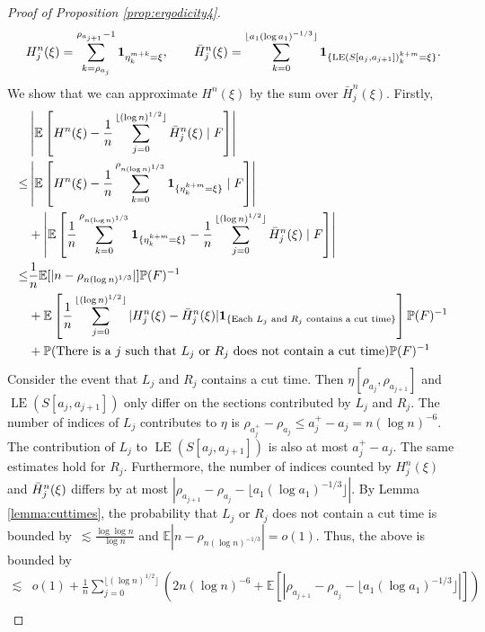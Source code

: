 \documentclass{article}
\DeclareMathOperator{\LE}{LE}
\renewcommand{\P}{\mathbb{P}}
\newcommand{\E}{\mathbb{E}}
\newcommand{\1}{\mathbf{1}}
\theoremstyle{definition}
\numberwithin{equation}{section}
\numberwithin{theorem}{section}
\begin{document}
\begin{proof}[Proof of Proposition \ref{prop:ergodicity4}]
\begin{equation}
    H^n_j(\xi)=\sum_{k=\rho_{a_j}}^{\rho_{a_{j+1}}-1}\1_{\eta_k^{m+k}=\xi},\qquad \Bar{H}^n_j(\xi)=\sum_{k=0}^{\lfloor a_1(\log a_1)^{-1/3}\rfloor}\1_{\{\LE(S[a_j,a_{j+1}])_k^{k+m}=\xi\}}.
\end{equation}
We show that we can approximate $H^n(\xi)$ by the sum over $\bar{H}_j^n(\xi)$. Firstly,
\begin{equation}
    \begin{split}
        &\left|\E\left[H^n(\xi)-\frac{1}{n}\sum_{j=0}^{\lfloor (\log n)^{1/2}\rfloor}\Bar{H}_j^n(\xi)\mid F\right]\right|\\
        \leq&\left|\E\left[H^n(\xi)-\frac{1}{n}\sum_{k=0}^{\rho_{n(\log n)^{1/3}}}\1_{\{\eta_{k}^{k+m}=\xi\}}\mid F\right]\right|\\
        &+\left|\E\left[\frac{1}{n}\sum_{k=0}^{\rho_{n(\log n)^{1/3}}}\1_{\{\eta_{k}^{k+m}=\xi\}}-\frac{1}{n}\sum_{j=0}^{\lfloor (\log n)^{1/2}\rfloor}\Bar{H}_j^n(\xi)\mid F\right]\right|\\
        \leq&\frac{1}{n}\E[|n-\rho_{n(\log n)^{1/3}}|]\P(F)^{-1}\\
        &+\E\left[\frac{1}{n}
        \sum_{j=0}^{\lfloor(\log n)^{1/2}\rfloor}|H_j^n(\xi)-\Bar{H}_j^n(\xi)|\1_{\{\text{Each $L_j$ and $R_j$ contains a cut time}\}}\right]\P(F)^{-1}\\
        &+\P(\text{There is a $j$ such that $L_j$ or $R_j$ does not contain a cut time})\P(F)^{-1}
    \end{split}
\end{equation}
Consider the event that $L_j$ and $R_j$ contains a cut time. Then $\eta[\rho_{a_j},\rho_{a_{j+1}}]$ and $\LE(S[a_j,a_{j+1}])$ only differ on the sections contributed by $L_j$ and $R_j$. The number of indices of $L_j$ contributes to $\eta$ is $\rho_{a_j^+}-\rho_{a_j}\leq a_j^+-a_j=n(\log n)^{-6}$. The contribution of $L_j$ to $\LE(S[a_j,a_{j+1}])$ is also at most $a_j^+-a_j$. The same estimates hold for $R_j$. Furthermore, the number of indices counted by $H_j^n(\xi)$ and $\Bar{H}_j^n(\xi)$ differs by at most $|\rho_{a_{j+1}}-\rho_{a_j}-\lfloor a_1(\log a_1)^{-1/3}\rfloor|$. By Lemma \ref{lemma:cuttimes}, the probability that $L_j$ or $R_j$ does not contain a cut time is bounded by~$\lesssim\frac{\log\log n}{\log n}$ and $\E|n-\rho_{n(\log n)^{-1/3}}|=o(1)$. Thus, the above is bounded by
\begin{equation}
    \begin{split}
        \lesssim&o(1)+\frac{1}{n}\sum_{j=0}^{\lfloor(\log n)^{1/2}\rfloor}\left(2n(\log n)^{-6}+\E[|\rho_{a_{j+1}}-\rho_{a_j}-\lfloor a_1(\log a_1)^{-1/3}\rfloor|]\right)\\

\end{split}
\end{equation}
\end{proof}
\end{document}
